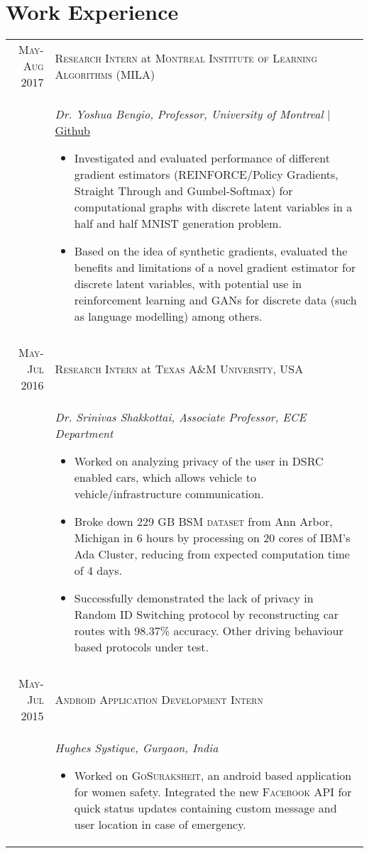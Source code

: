 \documentclass[a4paper,10pt]{article}
\begin{document}
\section{Work Experience}
\centering
\begin{longtable}{r|p{15cm}}
\textsc{May-Aug 2017} & \large \textsc{Research Intern} at \textsc{Montreal Institute of Learning Algorithms (MILA)}\\
& \textit{Dr. Yoshua Bengio, Professor, University of Montreal} | \href{https://github.com/architsharma97/MNIST}{Github}
\begin{itemize}
\item Investigated and evaluated performance of different gradient estimators (REINFORCE/Policy Gradients, Straight Through and Gumbel-Softmax) for computational graphs with discrete latent variables in a half and half MNIST generation problem.
\item Based on the idea of synthetic gradients, evaluated the benefits and limitations of a novel gradient estimator for discrete latent variables, with potential use in reinforcement learning and GANs for discrete data (such as language modelling) among others. 
\vspace*{-\baselineskip}
\end{itemize}
\\
\multicolumn{2}{c}{}\\
\textsc{May-Jul 2016} & \large \textsc{Research Intern} at \textsc{Texas A\&M University, USA}\\
& \textit{Dr. Srinivas Shakkottai, Associate Professor, ECE Department}
\begin{itemize}
 \item Worked on analyzing privacy of the user in DSRC enabled cars, which allows vehicle to vehicle/infrastructure communication.
 \item Broke down 229 GB \textsc{BSM dataset} from Ann Arbor, Michigan in 6 hours by processing on 20 cores of IBM's Ada Cluster, reducing from expected computation time of 4 days.
 \item Successfully demonstrated the lack of privacy in Random ID Switching protocol by reconstructing car routes with 98.37\% accuracy. Other driving behaviour based protocols under test. \vspace*{-\baselineskip}
\end{itemize}
\\
\multicolumn{2}{c}{}\\
\textsc{May-Jul 2015} & \large \textsc{Android Application Development Intern}\\
& \textit{Hughes Systique, Gurgaon, India}
\begin{itemize}
 \item Worked on \textsc{GoSuraksheit}, an android based application for women safety. Integrated the new \textsc{Facebook API} for quick status updates containing custom message and user location in case of emergency. \vspace*{-\baselineskip}
\end{itemize}\\
\end{longtable}
\end{document}
